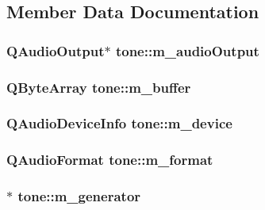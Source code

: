 \subsection{Member Data Documentation}
\hypertarget{classtone_a8d4a0b1f0f2a3b05fcd580d29e6c7feb}{
\subsubsection[{m\-\_\-audio\-Output}]{\setlength{\rightskip}{0pt plus 5cm}Q\-Audio\-Output$\ast$ tone\-::m\-\_\-audio\-Output\hspace{0.3cm}{\ttfamily [protected]}}}\label{classtone_a8d4a0b1f0f2a3b05fcd580d29e6c7feb}
\hypertarget{classtone_a9f2508fefb9803b27bb08276369e2036}{
\subsubsection[{m\-\_\-buffer}]{\setlength{\rightskip}{0pt plus 5cm}Q\-Byte\-Array tone\-::m\-\_\-buffer\hspace{0.3cm}{\ttfamily [protected]}}}\label{classtone_a9f2508fefb9803b27bb08276369e2036}
\hypertarget{classtone_ab3c3b5206828b0629a37174ba3b098b1}{
\subsubsection[{m\-\_\-device}]{\setlength{\rightskip}{0pt plus 5cm}Q\-Audio\-Device\-Info tone\-::m\-\_\-device\hspace{0.3cm}{\ttfamily [protected]}}}\label{classtone_ab3c3b5206828b0629a37174ba3b098b1}
\hypertarget{classtone_a556b7109c6895b2c5a3d011145a80952}{
\subsubsection[{m\-\_\-format}]{\setlength{\rightskip}{0pt plus 5cm}Q\-Audio\-Format tone\-::m\-\_\-format\hspace{0.3cm}{\ttfamily [protected]}}}\label{classtone_a556b7109c6895b2c5a3d011145a80952}
\hypertarget{classtone_aa49c08b076903abdbf974444a0efa2b7}{
\subsubsection[{m\-\_\-generator}]{$\ast$ tone\-::m\-\_\-generator}}\label{classtone_aa49c08b076903abdbf974444a0efa2b7}
